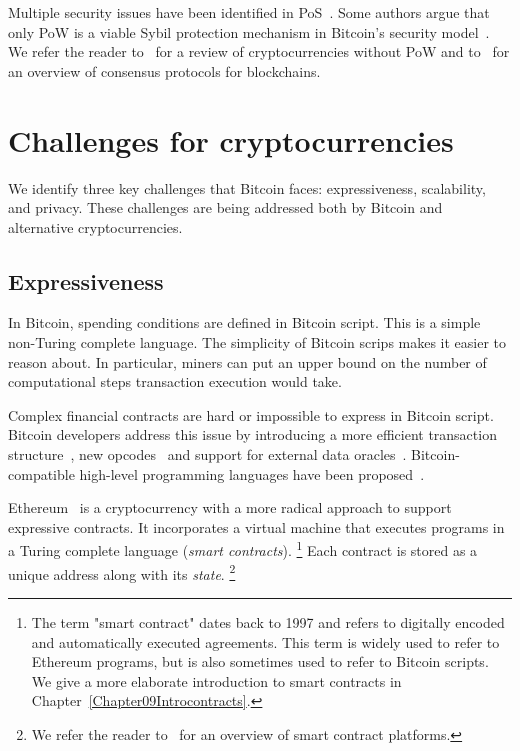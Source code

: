 Multiple security issues have been identified in PoS~\cite{Fanti2019,Gazi2018,BrownCohen2019,Chitra2020}.
Some authors argue that only PoW is a viable Sybil protection mechanism in Bitcoin's security model~\cite{Andreev2014, Sztorc2015, Poelstra2015}.
We refer the reader to~\cite{Bentov2016} for a review of cryptocurrencies without PoW and to~\cite{Bano2019} for an overview of consensus protocols for blockchains.



\section{Challenges for cryptocurrencies}

We identify three key challenges that Bitcoin faces: expressiveness, scalability, and privacy.
These challenges are being addressed both by Bitcoin and alternative cryptocurrencies.


\subsection{Expressiveness}

In Bitcoin, spending conditions are defined in Bitcoin script.
This is a simple non-Turing complete language.
The simplicity of Bitcoin scrips makes it easier to reason about.
In particular, miners can put an upper bound on the number of computational steps transaction execution would take.

Complex financial contracts are hard or impossible to express in Bitcoin script.
Bitcoin developers address this issue by introducing a more efficient transaction structure~\cite{Wuille2020}, new opcodes~\cite{Rubin2020} and support for external data oracles~\cite{Dryja}.
Bitcoin-compatible high-level programming languages have been proposed~\cite{OConnor2017, Wuille2019}.

Ethereum~\cite{Buterin2014, Wood2014} is a cryptocurrency with a more radical approach to support expressive contracts.
It incorporates a virtual machine that executes programs in a Turing complete language (\textit{smart contracts}).
\footnote{The term "smart contract" dates back to 1997 and refers to digitally encoded and automatically executed agreements. This term is widely used to refer to Ethereum programs, but is also sometimes used to refer to Bitcoin scripts. We give a more elaborate introduction to smart contracts in Chapter~\ref{Chapter09Introcontracts}.}
Each contract is stored as a unique address along with its \textit{state}.
\footnote{We refer the reader to~\cite{Bartoletti2017} for an overview of smart contract platforms.}


